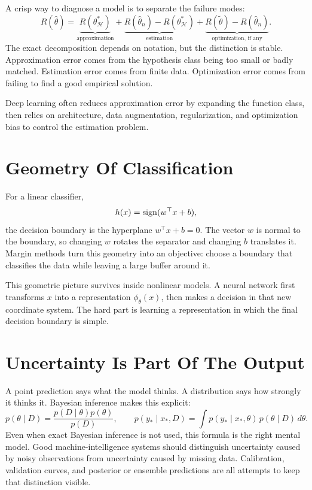 A crisp way to diagnose a model is to separate the failure modes:
\[
  R(\hat{\theta})
  =
  \underbrace{R(\theta^\ast_{\mathcal{H}})}_{\text{approximation}}
  +
  \underbrace{R(\hat{\theta}_n)-R(\theta^\ast_{\mathcal{H}})}_{\text{estimation}}
  +
  \underbrace{R(\tilde{\theta})-R(\hat{\theta}_n)}_{\text{optimization, if any}}.
\]
The exact decomposition depends on notation, but the distinction is stable. Approximation error comes from the hypothesis class being too small or badly matched. Estimation error comes from finite data. Optimization error comes from failing to find a good empirical solution.

Deep learning often reduces approximation error by expanding the function class, then relies on architecture, data augmentation, regularization, and optimization bias to control the estimation problem.

\section*{Geometry Of Classification}

For a linear classifier,
\[
  h(x) = \operatorname{sign}(w^\top x + b),
\]
the decision boundary is the hyperplane \(w^\top x + b=0\). The vector \(w\) is normal to the boundary, so changing \(w\) rotates the separator and changing \(b\) translates it. Margin methods turn this geometry into an objective: choose a boundary that classifies the data while leaving a large buffer around it.

This geometric picture survives inside nonlinear models. A neural network first transforms \(x\) into a representation \(\phi_\theta(x)\), then makes a decision in that new coordinate system. The hard part is learning a representation in which the final decision boundary is simple.

\section*{Uncertainty Is Part Of The Output}

A point prediction says what the model thinks. A distribution says how strongly it thinks it. Bayesian inference makes this explicit:
\[
  p(\theta \mid D)
  =
  \frac{p(D\mid \theta)p(\theta)}{p(D)},
  \qquad
  p(y_\ast \mid x_\ast,D)
  =
  \int p(y_\ast\mid x_\ast,\theta)\,p(\theta\mid D)\,d\theta.
\]
Even when exact Bayesian inference is not used, this formula is the right mental model. Good machine-intelligence systems should distinguish uncertainty caused by noisy observations from uncertainty caused by missing data. Calibration, validation curves, and posterior or ensemble predictions are all attempts to keep that distinction visible.
